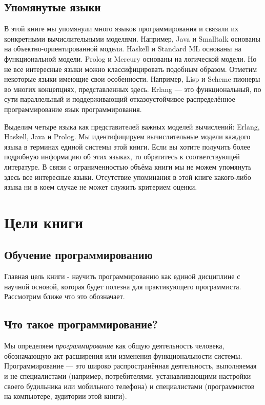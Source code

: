 \subsection*{Упомянутые языки}

В этой книге мы упомянули много языков программирования и связали их конкретными вычислительными моделями. Например, Java и Smalltalk основаны на объектно-ориентированной модели. {Haskell} и { Standard ML} основаны на функциональной модели. Prolog и Mercury основаны на логической модели. Но не все интересные языки можно классифицировать подобным образом. Отметим некоторые языки имеющие свои особенности. Например, Lisp и Scheme пионеры во многих концепциях, представленных здесь. Erlang --- это функциональный, по сути параллельный и поддерживающий отказоустойчивое распределённое программирование язык программирования.

Выделим четыре языка как представителей важных моделей вычислений: Erlang, Haskell, Java и Prolog. Мы идентифицируем вычислительные модели каждого языка в терминах единой системы этой книги. Если вы хотите получить более подробную информацию об этих языках, то обратитесь к соответствующей литературе. В связи с ограниченностью объёма книги мы не можем упомянуть здесь все интересные языки. Отсутствие упоминания в этой книге какого-либо языка ни в коем случае не может служить критерием оценки.

\section*{Цели книги}

\subsection*{Обучение программированию}

Главная цель книги - научить программированию как единой дисциплине с научной основой, которая будет полезна для практикующего программиста. Рассмотрим ближе что это обозначает.

\subsection*{Что такое программирование?}

Мы определяем \emph{программирование} как общую деятельность человека, обозначающую акт расширения или изменения функциональности системы. Программирование --- это широко распространённая деятельность, выполняемая и не-специалистами (например, потребителями, устанавливающими настройки своего будильника или мобильного телефона) и специалистами (программистов на компьютере, аудитории этой книги).

